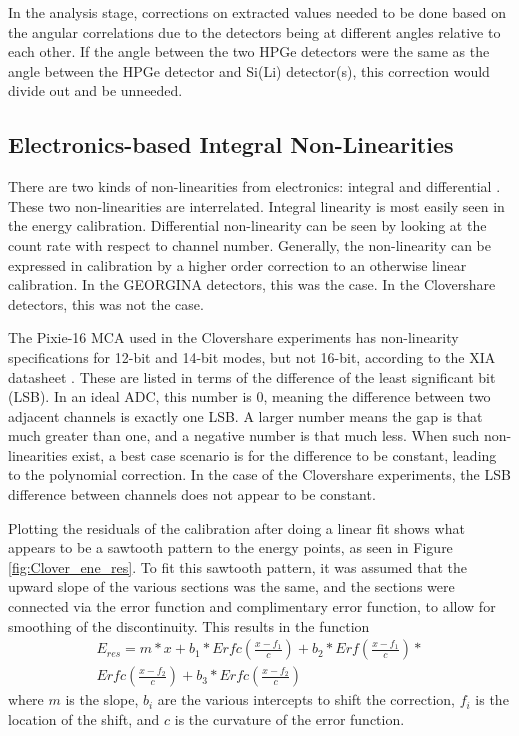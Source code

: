 In the analysis stage, corrections on extracted values needed to be done based on the angular correlations due to the detectors being at different angles relative to each other. If the angle between the two HPGe detectors were the same as the angle between the HPGe detector and Si(Li) detector(s), this correction would divide out and be unneeded.

\subsection{Electronics-based Integral Non-Linearities}
\label{sec:non-linearity}

There are two kinds of non-linearities from electronics: integral and differential \citep{knoll00:rad_det_meas}. These two non-linearities are interrelated. Integral linearity is most easily seen in the energy calibration. Differential non-linearity can be seen by looking at the count rate with respect to channel number. Generally, the non-linearity can be expressed in calibration by a higher order correction to an otherwise linear calibration. In the GEORGINA detectors, this was the case. In the Clovershare detectors, this was not the case. 

The Pixie-16 MCA used in the Clovershare experiments has non-linearity specifications for 12-bit and 14-bit modes, but not 16-bit, according to the XIA datasheet \citep{xia:_pixie}. These are listed in terms of the difference of the least significant bit (LSB). In an ideal ADC, this number is 0, meaning the difference between two adjacent channels is exactly one LSB. A larger number means the gap is that much greater than one, and a negative number is that much less. When such non-linearities exist, a best case scenario is for the difference to be constant, leading to the polynomial correction. In the case of the Clovershare experiments, the LSB difference between channels does not appear to be constant.

Plotting the residuals of the calibration after doing a linear fit shows what appears to be a sawtooth pattern to the energy points, as seen in Figure \ref{fig:Clover_ene_res}. To fit this sawtooth pattern, it was assumed that the upward slope of the various sections was the same, and the sections were connected via the error function and complimentary error function, to allow for smoothing of the discontinuity. This results in the function
\begin{equation}
    \begin{aligned}
    	E_{res}= m*x+b_1*Erfc\left(\frac{x-f_1}{c}\right)+b_2*Erf\left(\frac{x-f_1}{c}\right)*\\Erfc\left(\frac{x-f_2}{c}\right)+b_3*Erfc\left(\frac{x-f_2}{c}\right)
    \end{aligned}
\end{equation}
where $m$ is the slope, $b_i$ are the various intercepts to shift the correction, $f_i$ is the location of the shift, and $c$ is the curvature of the error function.

